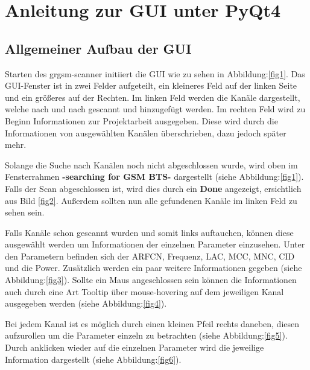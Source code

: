 
\chapter{Anleitung zur GUI unter PyQt4}

\section{Allgemeiner Aufbau der GUI}

Starten des grgsm-scanner initiiert die GUI wie zu sehen in Abbildung:\ref{fig1}.
Das GUI-Fenster ist in zwei Felder aufgeteilt, ein kleineres Feld auf der linken Seite
und ein größeres auf der Rechten.
Im linken Feld werden die Kanäle dargestellt, welche nach und nach gescannt und hinzugefügt werden.
Im rechten Feld wird zu Beginn Informationen zur Projektarbeit ausgegeben. Diese wird durch die Informationen von ausgewählten Kanälen überschrieben, dazu jedoch später mehr.


\noindent Solange die Suche nach Kanälen noch nicht abgeschlossen wurde, wird oben im Fensterrahmen \textbf{-searching for GSM BTS-} dargestellt (siehe Abbildung:\ref{fig1}).
Falls der Scan abgeschlossen ist, wird dies durch ein \textbf{Done} angezeigt, ersichtlich aus Bild \ref{fig2}. Außerdem sollten nun alle gefundenen Kanäle im linken Feld zu sehen sein.



\noindent Falls Kanäle schon gescannt wurden und somit links auftauchen, können diese ausgewählt werden um Informationen der einzelnen Parameter einzusehen.
Unter den Parametern befinden sich der ARFCN, Frequenz, LAC, MCC, MNC, CID und die Power.
Zusätzlich werden ein paar weitere Informationen gegeben (siehe Abbildung:\ref{fig3}).
Sollte ein Maus angeschlossen sein können die Informationen auch durch eine Art Tooltip über mouse-hovering auf dem jeweiligen Kanal ausgegeben werden (siehe Abbildung:\ref{fig4}).




\newpage Bei jedem Kanal ist es möglich durch einen kleinen Pfeil rechts daneben, diesen aufzurollen um die Parameter einzeln zu betrachten (siehe Abbildung:\ref{fig5}). Durch anklicken wieder auf die einzelnen Parameter wird die jeweilige Information dargestellt (siehe Abbildung:\ref{fig6}).

